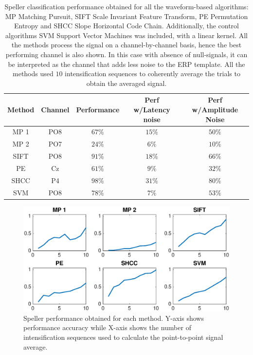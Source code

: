\documentclass[brainsci,article,submit,moreauthors,pdftex,10pt,a4paper]{mdpi}
\begin{document}
\begin{table}[H]
\caption{Speller classification performance obtained for all the waveform-based algorithms: MP Matching Pursuit, SIFT Scale Invariant Feature Transform, PE Permutation Entropy and SHCC Slope Horizontal Code Chain. Additionally, the control algorithms SVM Support Vector Machines was included, with a linear kernel.  All the methods process the signal on a channel-by-channel basis, hence the best performing channel is also shown. In this case with absence of null-signals, it can be interpreted as the channel that adds less noise to the ERP template.  All the methods used $10$ intensification sequences to coherently average the trials to obtain the averaged signal. }
\centering
\begin{tabular}{ccccc}
\toprule
\textbf{Method}	& \textbf{Channel} &  \textbf{Performance} & \textbf{Perf w/Latency noise}	& \textbf{Perf w/Amplitude Noise}\\
\midrule
MP 1 & PO8  & $67\%$ & $15\%$ & $50\%$\\
MP 2 & PO7 & $24\%$ & $6\%$ & $10\%$\\
SIFT  & PO8 & $91\%$ & $18\%$ & $66\%$\\
PE     & Cz & $61\%$ & $9\%$ & $32\%$\\
SHCC & P4 & $98\%$ & $31\%$ & $80\%$\\
SVM     & PO8  & $78\%$ & $7\%$ & $53\%$\\
\bottomrule
\end{tabular}
\label{tab:results}
\end{table}

\begin{figure}[H]
\centering
\includegraphics[width=15cm]{images/CrossPerformanceTest.eps}
\caption{Speller performance obtained for each method.  Y-axis shows performance accuracy while X-axis shows the number of intensification sequences used to calculate the point-to-point signal average.}
\label{fig:performancetest}
\end{figure}
\end{document}
